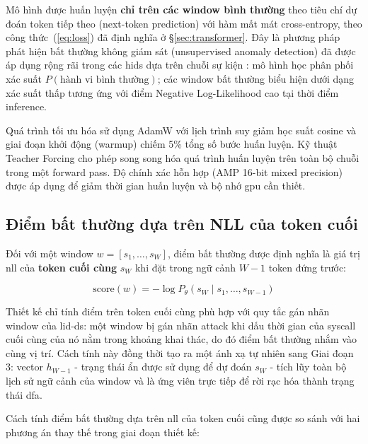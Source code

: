 \documentclass[../main.tex]{subfiles}
\begin{document}
Mô hình được huấn luyện \textbf{chỉ trên các window bình thường} theo
tiêu chí dự đoán
token tiếp theo (next-token prediction) với hàm mất mát cross-entropy, theo công
thức~(\ref{eq:loss}) đã định nghĩa ở §\ref{sec:transformer}. Đây là
phương pháp phát
hiện bất thường không giám sát (unsupervised anomaly detection)
\cite{pang2021deep} đã
được áp dụng rộng rãi
trong các \gls{hids} dựa trên chuỗi sự kiện
\cite{du2017deeplog,fournier2023language}:
mô hình học phân phối xác suất $P(\text{hành vi bình thường})$; các
window bất thường
biểu hiện dưới dạng xác suất thấp tương ứng với điểm Negative
Log-Likelihood cao tại
thời điểm inference.

Quá trình tối ưu hóa sử dụng AdamW \cite{loshchilov2019adamw} với
lịch trình suy giảm học suất
cosine \cite{loshchilov2017sgdr} và giai đoạn
khởi động (warmup) chiếm 5\% tổng số bước huấn luyện. Kỹ thuật
Teacher Forcing \cite{williams1989teacher} cho phép
song song hóa quá trình huấn luyện trên toàn bộ chuỗi trong một
forward pass. Độ chính
xác hỗn hợp (AMP 16-bit mixed precision) \cite{micikevicius2018mixed}
được áp dụng để giảm thời
gian huấn luyện và
bộ nhớ \gls{gpu} cần thiết.

\subsection{Điểm bất thường dựa trên NLL của token cuối}
\label{sec:anomaly_score}

Đối với một window $w = [s_1, \ldots, s_W]$, điểm bất thường được
định nghĩa là giá trị
\gls{nll} của \textbf{token cuối cùng} $s_W$ khi
đặt trong ngữ cảnh
$W-1$ token đứng trước:

\begin{equation}
  \label{eq:anomaly_score}
  \text{score}(w) = -\log P_\theta(s_W \mid s_1, \ldots, s_{W-1})
\end{equation}

Thiết kế chỉ tính điểm trên token cuối cùng phù hợp với quy tắc gán
nhãn window của
\gls{lid-ds}: một window bị gán nhãn attack khi dấu thời gian của \gls{syscall}
cuối cùng của nó nằm
trong khoảng khai thác, do đó điểm bất thường nhắm vào cùng vị trí.
Cách tính này đồng
thời tạo ra một ánh xạ tự nhiên sang Giai đoạn 3: vector $h_{W-1}$ -
trạng thái ẩn được
sử dụng để dự đoán $s_W$ - tích lũy toàn bộ lịch sử ngữ cảnh của
window và là ứng viên
trực tiếp để rời rạc hóa thành trạng thái \gls{dfa}.

Cách tính điểm bất thường dựa trên \gls{nll} của token cuối cũng được
so sánh với hai
phương án thay thế trong giai đoạn thiết kế:
\end{document}
